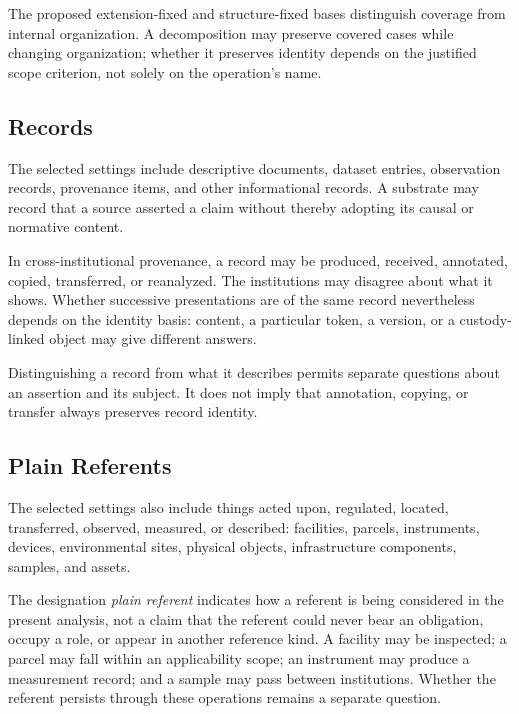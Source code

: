 The proposed extension-fixed and structure-fixed bases distinguish
coverage from internal organization.
A decomposition may preserve
covered cases while changing organization; whether it preserves
identity depends on the justified scope criterion, not solely on
the operation's name.

\subsection{Records}
\label{subsec:inventory_records}

The selected settings include descriptive documents, dataset entries,
observation records, provenance items, and other informational records.
A substrate may record that a source asserted a claim without thereby
adopting its causal or normative content.

In cross-institutional provenance, a record may be produced, received,
annotated, copied, transferred, or reanalyzed.
The institutions may
disagree about what it shows.
Whether successive presentations are
of the same record nevertheless depends on the identity basis:
content, a particular token, a version, or a custody-linked object
may give different answers.

Distinguishing a record from what it describes permits separate
questions about an assertion and its subject.
It does not imply that
annotation, copying, or transfer always preserves record identity.

\subsection{Plain Referents}
\label{subsec:inventory_plain_referents}

The selected settings also include things acted upon, regulated,
located, transferred, observed, measured, or described: facilities,
parcels, instruments, devices, environmental sites, physical objects,
infrastructure components, samples, and assets.

The designation \emph{plain referent} indicates how a referent is being
considered in the present analysis, not a claim that the referent
could never bear an obligation, occupy a role, or appear in another
reference kind.
A facility may be inspected; a parcel may fall within
an applicability scope; an instrument may produce a measurement record;
and a sample may pass between institutions.
Whether the referent
persists through these operations remains a separate question.

